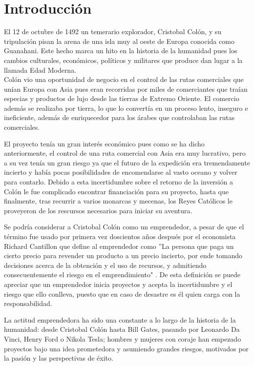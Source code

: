 \chapter{Introducción}

El 12 de octubre de 1492 un temerario explorador, Cristobal Colón, y su tripulación pisan la arena de una isla muy al oeste de Europa conocida como Guanahani. Este hecho marca un hito en la historia de la humanidad pues los cambios culturales, económicos, políticos y militares que produce dan lugar a la llamada Edad Moderna.\\
Colón vio una oportunidad de negocio en el control de las rutas comerciales que unían Europa con Asia pues eran recorridas por miles de comerciantes que traían especias y productos de lujo desde las tierras de Extremo Oriente. El comercio además se realizaba por tierra, lo que lo convertía en un proceso lento, inseguro e ineficiente, además de enriquecedor para los árabes que controlaban las rutas comerciales.

El proyecto tenía un gran interés económico pues como se ha dicho anteriormente, el control de una ruta comercial con Asia era muy lucrativo, pero a su vez tenía un gran riesgo ya que el futuro de la expedición era tremendamente incierto y había pocas posibilidades de encomendarse al vasto oceano y volver para contarlo. Debido a esta incertidumbre sobre el retorno de la inversión a Colón le fue complicado encontrar financiación para su proyecto, hasta que finalmente, tras recurrir a varios monarcas y mecenas,  los Reyes Católicos le proveyeron de los rescursos necesarios para iniciar su aventura.

Se podría considerar a Cristobal Colón como un emprendedor, a pesar de que el término fue usado por primera vez doscientos años después por el economista Richard Cantillon que define al emprendedor como ''La persona que paga un cierto precio para revender un producto a un precio incierto, por ende tomando decisiones acerca de la obtención y el uso de recursos, y admitiendo consecuentemente el riesgo en el emprendimiento" \cite[ pág 21]{ashokbhanudasnavale2013}.
De esta definición se puede apreciar que un emprendedor inicia proyectos y acepta la incertidumbre y el riesgo que ello conlleva, puesto que en caso de desastre es él quien carga con la responsabilidad.

La actitud emprendedora ha sido una constante a lo largo de la historia de la humanidad: desde Cristobal Colón hasta Bill Gates, pasando por Leonardo Da Vinci, Henry Ford o Nikola Tesla; hombres y mujeres con coraje han empezado proyectos bajo una idea prometedora y asumiendo grandes riesgos, motivados por la pasión y las perspectivas de éxito. 

